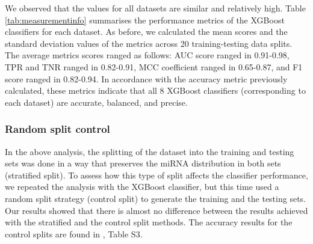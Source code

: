 \documentclass{bmcart}
\begin{document}
We observed that the values for all datasets are similar and relatively high. Table \ref{tab:measurementinfo} summarises the performance metrics of the XGBoost classifiers for each dataset. As before, we calculated the mean scores and the standard deviation values of the metrics across 20 training-testing data splits. The average metrics scores ranged as follows: AUC score ranged in 0.91-0.98, TPR and TNR ranged in 0.82-0.91, MCC coefficient ranged in 0.65-0.87, and F1 score ranged in 0.82-0.94. In accordance with the accuracy metric previously calculated, these metrics indicate that all 8 XGBoost classifiers (corresponding to each dataset) are accurate, balanced, and precise. 


\subsubsection*{Random split control}
In the above analysis, the splitting of the dataset into the training and testing sets was done in a way that preserves the miRNA distribution in both sets (stratified split). To assess how this type of split affects the classifier performance, we repeated the analysis with the XGBoost classifier, but this time used a random split strategy (control split) to generate the training and the testing sets. Our results showed that there is almost no difference between the results achieved with the stratified and the control split methods. The accuracy results for the control splits are found in , Table S3.
\end{document}
